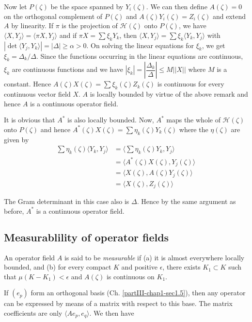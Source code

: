 Now let $P(\zeta)$ be the space spanned by $Y_i(\zeta)$. We can then
define $A(\zeta)=0$ on the orthogonal complement of $P(\zeta)$ and
$A(\zeta)Y_i(\zeta)=Z_i(\zeta)$ and extend $A$ by linearity. If $\pi$
is the projection of  $\mathscr{H}(\zeta)$ onto $P(\zeta)$, we have $
\langle X,Y_j \rangle  =  \langle \pi X,Y_j \rangle $  and if $\pi
X=\sum \xi_k Y_k$, then $\langle X,Y_j \rangle=\sum \xi_k \langle
Y_k,Y_j \rangle$ with $| \det \langle Y_j,Y_k \rangle| = |
\Delta | \ge \alpha>0$. On solving the linear equations for
$\xi_k$, we get $\xi_k=\Delta_k/ \Delta$.  Since the functions
occurring in the linear equations are continuous, $\xi_k$ are
continuous functions and we have 
$|\xi_k|=|\dfrac{\Delta_k}{\Delta}| \le M|| X ||$ where
$M$ is a constant. Hence $A(\zeta)X(\zeta)=\sum\xi_k(\zeta)Z_k(\zeta)$
is continuous for every continuous  vector field $X$. $A$ is locally
bounded by virtue of the above remark and hence $A$ is a continuous
operator field. 
  
It is obvious that $A^*$ is also locally bounded. Now, $A^*$ maps the
whole of $\mathscr{H}(\zeta)$ onto $P(\zeta)$ and hence
$A^*(\zeta)X(\zeta)=\sum\eta_k(\zeta)Y_k(\zeta)$ 
where the $\eta(\zeta) $ are given by
\begin{align*}
\sum \eta_k(\zeta) \langle   Y_k,Y_j \rangle &= \langle \sum
\eta_k(\zeta)Y_k,Y_j \rangle\\ 
&=\langle A^*(\zeta)X(\zeta),Y_j(\zeta) \rangle\\
&=\langle X(\zeta),A(\zeta)Y_j(\zeta) \rangle\\
&=\langle X(\zeta),Z_j(\zeta) \rangle
\end{align*}

The Gram determinant in this case also is $\Delta$. Hence by the same
argument as before, $A^*$ is a continuous operator field. 

\subsection{Measurablility of operator
fields}\label{partIII-chap1-sec1.7}\pageoriginale %

\begin{defi*}
An operator field $A$ is said to be {\em measurable} if (a) it is
almost everywhere locally bounded, and (b) for every compact $K$ and
positive  $\epsilon$, there exists $K_1\subset K$ such that
$\mu(K-K_1)<\epsilon$ and $A(\zeta)$ is continuous on $K_1$. 
\end{defi*}

If $(e_p)$  form an orthogonal basis (Ch. \ref{partIII-chap1-sec1.5}),
then any operator 
can be expressed by means of a matrix with respect to this base. The
matrix coefficients are only  $\langle Ae_p, e_q \rangle$. We then
have 

